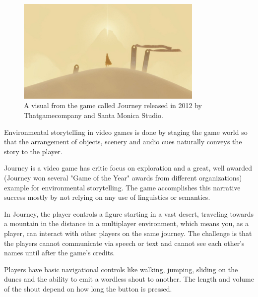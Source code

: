             \begin{figure}[H]
                \centering
                \includegraphics[width=0.8\textwidth]{images/journey.jpg}
                \caption{A visual from the game called Journey released in 2012 by Thatgamecompany and Santa Monica Studio.}
                \label{fig:JOURNEY}
            \end{figure}

            Environmental storytelling in video games is done by staging the game world so that the arrangement of objects, scenery and audio cues naturally conveys the story to the player\cite{BioShock_Infinite}.\par

            Journey is a video game has critic focus on exploration and a great, well awarded (Journey won several "Game of the Year" awards from different organizations) example for environmental storytelling. The game accomplishes this narrative success mostly by not relying on any use of linguistics or semantics.\par

            In Journey, the player controls a figure starting in a vast desert, traveling towards a mountain in the distance in a multiplayer environment, which means you, as a player, can interact with other players on the same journey. The challenge is that the players cannot communicate via speech or text and cannot see each other's names until after the game's credits.\par

            Players have basic navigational controls like walking, jumping, sliding on the dunes and the ability to emit a wordless shout to another. The length and volume of the shout depend on how long the button is pressed.\par

